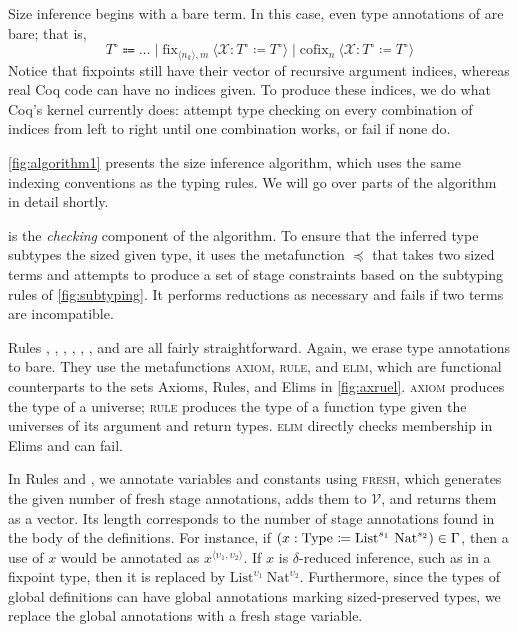 \documentclass[nonacm,screen,10pt]{acmart}
\begin{document}


Size inference begins with a bare term. In this case, even type annotations of \cofixpoints are bare; that is, $$T^\circ \Coloneqq \dots \mid \text{fix}_{\langle n_k \rangle, m}\ \langle \mathcal{X} : T^\circ \coloneqq T^\circ \rangle \mid \text{cofix}_{n}\ \langle \mathcal{X} : T^\circ \coloneqq T^\circ \rangle$$
Notice that fixpoints still have their vector of recursive argument indices, whereas real Coq code can have no indices given. To produce these indices, we do what Coq's kernel currently does: attempt type checking on every combination of indices from left to right until one combination works, or fail if none do.

\autoref{fig:algorithm1} presents the size inference algorithm, which uses the same indexing conventions as the typing rules. We will go over parts of the algorithm in detail shortly.

 is the \textit{checking} component of the algorithm. To ensure that the inferred type subtypes the sized given type, it uses the metafunction $\preceq$ that takes two sized terms and attempts to produce a set of stage constraints based on the subtyping rules of \autoref{fig:subtyping}. It performs reductions as necessary and fails if two terms are incompatible.

Rules , , , , , , and  are all fairly straightforward. Again, we erase type annotations to bare. They use the metafunctions \textsc{axiom}, \textsc{rule}, and \textsc{elim}, which are functional counterparts to the sets Axioms, Rules, and Elims in \autoref{fig:axruel}. \textsc{axiom} produces the type of a universe; \textsc{rule} produces the type of a function type given the universes of its argument and return types. \textsc{elim} directly checks membership in Elims and can fail.

In Rules  and , we annotate variables and constants using \textsc{fresh}, which generates the given number of fresh stage annotations, adds them to $\mathcal{V}$, and returns them as a vector. Its length corresponds to the number of stage annotations found in the body of the definitions. For instance, if $(x : \Type{} \coloneqq \text{List}^{s_1}\ \text{Nat}^{s_2}) \in \Gamma$, then a use of $x$ would be annotated as $x^{\langle \upsilon_1, \upsilon_2 \rangle}$. If $x$ is $\delta$-reduced inference, such as in a fixpoint type, then it is replaced by $\text{List}^{\upsilon_1}\ \text{Nat}^{\upsilon_2}$. Furthermore, since the types of global definitions can have global annotations marking sized-preserved types, we replace the global annotations with a fresh stage variable.
\end{document}
